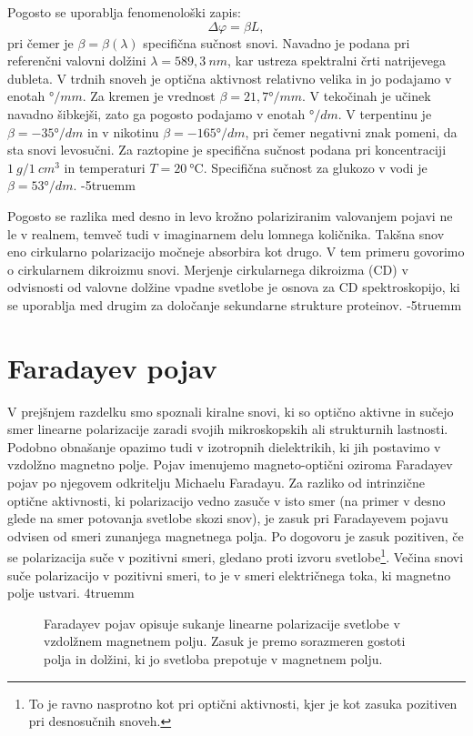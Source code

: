 Pogosto se uporablja fenomenološki zapis:
\begin{equation}
\Delta \varphi = \beta L,
\label{eq:09_50}
\end{equation}
pri čemer je $\beta = \beta (\lambda)$ specifična sučnost snovi. Navadno je podana pri referenčni
valovni dolžini $\lambda = 589,3~\si{nm}$, kar ustreza spektralni črti natrijevega dubleta. V
trdnih snoveh je optična aktivnost relativno velika in jo podajamo v enotah $\si{\degree}/\si{mm}$. Za 
kremen je vrednost $\beta = 21,7\si{\degree}/\si{mm}$. V tekočinah je učinek
navadno šibkejši, zato ga pogosto podajamo v enotah $\si{\degree}/\si{dm}$. V terpentinu
je $\beta = -35\si{\degree}/\si{dm}$ in v nikotinu $\beta = -165\si{\degree}/\si{dm}$,
pri čemer negativni znak pomeni, da sta snovi levosučni. Za raztopine je specifična sučnost
podana pri koncentraciji $1~\si{g}/1~\si{cm}^3$ in temperaturi $T = 20~\si{\celsius}$. 
Specifična sučnost za glukozo v vodi je $\beta = 53\si{\degree}/\si{dm}$.
\vglue-5truemm
\begin{remark}
Pogosto se razlika med desno in levo krožno polariziranim valovanjem pojavi ne le v realnem, 
temveč tudi v imaginarnem delu lomnega količnika. Takšna snov eno cirkularno polarizacijo močneje
absorbira kot drugo. V tem primeru govorimo o cirkularnem dikroizmu snovi. Merjenje cirkularnega
dikroizma (CD) v odvisnosti od valovne dolžine vpadne svetlobe je osnova za CD spektroskopijo, ki
se uporablja med drugim za določanje sekundarne strukture proteinov. 
\vglue-5truemm
\end{remark}

\section{Faradayev pojav}
V prejšnjem razdelku smo spoznali kiralne snovi, ki so optično aktivne in sučejo smer
linearne polarizacije zaradi svojih mikroskopskih ali strukturnih lastnosti. 
Podobno obnašanje opazimo tudi v izotropnih dielektrikih, ki jih postavimo v vzdolžno
magnetno polje. Pojav imenujemo magneto-optični oziroma Faradayev pojav
po njegovem odkritelju Michaelu Faradayu. Za razliko 
od intrinzične optične aktivnosti, ki polarizacijo vedno zasuče v isto smer (na primer
v desno glede na smer potovanja svetlobe skozi snov), je zasuk pri Faradayevem pojavu 
odvisen od smeri zunanjega 
magnetnega polja. Po dogovoru je zasuk pozitiven, če se polarizacija suče v 
pozitivni smeri, gledano proti izvoru svetlobe\footnote{To je ravno nasprotno kot
pri optični aktivnosti, kjer je kot zasuka pozitiven pri desnosučnih snoveh.}.
Večina snovi suče polarizacijo v pozitivni smeri, to je v smeri električnega toka, ki
magnetno polje ustvari. 
\vglue4truemm
\begin{figure}[ht]
\centering
\def\svgwidth{120truemm} 

\caption{Faradayev pojav opisuje sukanje linearne polarizacije svetlobe v vzdolžnem mag\-net\-nem
polju. Zasuk je premo sorazmeren gostoti polja in dolžini, ki jo svetloba prepotuje
v magnetnem polju.}
\label{fig:09_Faraday}
\end{figure}

